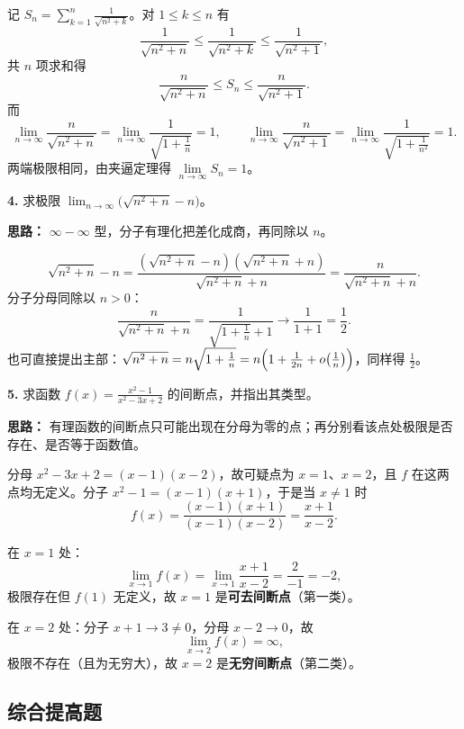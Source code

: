 记 $\displaystyle S_n=\sum_{k=1}^{n}\frac{1}{\sqrt{n^2+k}}$。对 $1\le k\le n$ 有
\[
\frac{1}{\sqrt{n^2+n}}\le\frac{1}{\sqrt{n^2+k}}\le\frac{1}{\sqrt{n^2+1}},
\]
共 $n$ 项求和得
\[
\frac{n}{\sqrt{n^2+n}}\le S_n\le\frac{n}{\sqrt{n^2+1}}.
\]
而
\[
\lim_{n\to\infty}\frac{n}{\sqrt{n^2+n}}
=\lim_{n\to\infty}\frac{1}{\sqrt{1+\frac1n}}=1,
\qquad
\lim_{n\to\infty}\frac{n}{\sqrt{n^2+1}}
=\lim_{n\to\infty}\frac{1}{\sqrt{1+\frac{1}{n^2}}}=1.
\]
两端极限相同，由夹逼定理得 $\lim\limits_{n\to\infty}S_n=1$。


\else \answerarea[8] \fi%

\textbf{4.} 求极限 $\displaystyle\lim_{n\to\infty}\bigl(\sqrt{n^2+n}-n\bigr)$。

\ifshowsolutions%
\textbf{思路：} $\infty-\infty$ 型，分子有理化把差化成商，再同除以 $n$。

\[
\sqrt{n^2+n}-n
=\frac{(\sqrt{n^2+n}-n)(\sqrt{n^2+n}+n)}{\sqrt{n^2+n}+n}
=\frac{n}{\sqrt{n^2+n}+n}.
\]
分子分母同除以 $n>0$：
\[
\frac{n}{\sqrt{n^2+n}+n}
=\frac{1}{\sqrt{1+\frac1n}+1}\longrightarrow\frac{1}{1+1}=\frac12 .
\]
也可直接提出主部：$\sqrt{n^2+n}=n\sqrt{1+\frac1n}=n\Bigl(1+\frac{1}{2n}+o\bigl(\frac1n\bigr)\Bigr)$，同样得 $\frac12$。


\else \answerarea[8] \fi%

\textbf{5.} 求函数 $\displaystyle f(x)=\frac{x^2-1}{x^2-3x+2}$ 的间断点，并指出其类型。

\ifshowsolutions%
\textbf{思路：} 有理函数的间断点只可能出现在分母为零的点；再分别看该点处极限是否存在、是否等于函数值。

分母 $x^2-3x+2=(x-1)(x-2)$，故可疑点为 $x=1$、$x=2$，且 $f$ 在这两点均无定义。分子 $x^2-1=(x-1)(x+1)$，于是当 $x\ne1$ 时
\[
f(x)=\frac{(x-1)(x+1)}{(x-1)(x-2)}=\frac{x+1}{x-2}.
\]

在 $x=1$ 处：
\[
\lim_{x\to1}f(x)=\lim_{x\to1}\frac{x+1}{x-2}=\frac{2}{-1}=-2,
\]
极限存在但 $f(1)$ 无定义，故 $x=1$ 是\textbf{可去间断点}（第一类）。

在 $x=2$ 处：分子 $x+1\to3\ne0$，分母 $x-2\to0$，故
\[
\lim_{x\to2}f(x)=\infty,
\]
极限不存在（且为无穷大），故 $x=2$ 是\textbf{无穷间断点}（第二类）。


\else \answerarea[10] \fi%

\subsection{综合提高题}

